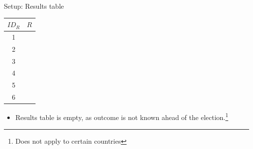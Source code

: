 \documentclass{beamer}
\begin{document}
\begin{frame}{Setup: Results table}
	\begin{center}
		\begin{tabular}{|c|c|}
			\hline
			$ID_R$ & $R$ \\
			\hline
			1 & \\
			2 & \\
			3 & \\
			4 & \\
			5 & \\
			6 & \\
			\hline
		\end{tabular}
	\end{center}

	\begin{itemize}
		\item Results table is empty, as outcome is not known ahead of
			the election.\footnote{Does not apply to certain
			countries}
	\end{itemize}
\end{frame}
\end{document}
